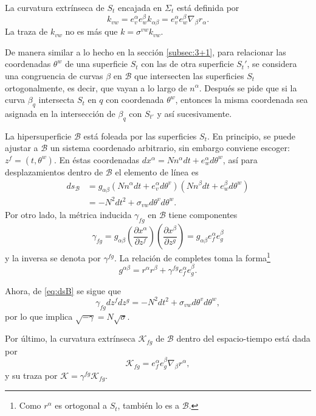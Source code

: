 La curvatura extr\'{i}nseca de $S_{t}$ encajada en $\Sigma_t$ est\'{a} definida por
%
\begin{equation}
\label{eq:extrinseccurvSt}
k_{vw} = e^{\alpha}_{v} e^{\beta}_{w} k_{\alpha \beta} = e^{\alpha}_{v} e^{\beta}_{w} \nabla_{\beta} r_{\alpha}.
\end{equation}
%
La traza de $k_{vw}$ no es m\'{a}s que $k = \sigma^{vw} k_{vw}$.

De manera similar a lo hecho en la secci\'{o}n \ref{subsec:3+1}, para relacionar las coordenadas $\theta^{w}$ de una superficie $S_{t}$ con las de otra superficie $S_{t}'$, se considera una congruencia de curvas $\beta$ en $\mathcal{B}$ que intersecten las superficies $S_{t}$ ortogonalmente, es decir, que vayan a lo largo de $n^{\alpha}$. Despu\'{e}s se pide que si la curva $\beta_{q}$ intersecta $S_{t}$ en $q$ con coordenada $\theta^{w}$, entonces la misma coordenada sea asignada en la intersecci\'{o}n de $\beta_{q}$ con $S_{t'}$ y as\'{i} sucesivamente.

La hipersuperficie $\mathcal{B}$ est\'{a} foleada por las superficies $S_{t}$. En principio, se puede ajustar a $\mathcal{B}$ un sistema coordenado arbitrario, sin embargo conviene escoger: $z^{f} = (t, \theta^{w})$. En \'{e}stas coordenadas $dx^{\alpha} = N n^{\alpha} dt + e^{\alpha}_{w} d \theta^{w}$, as\'{i} para desplazamientos dentro de $\mathcal{B}$ el elemento de l\'{i}nea es
%
\begin{align}
\label{eq:dsB}
ds_{\mathcal{B}} & = g_{\alpha \beta} (N n^{\alpha} dt + e^{\alpha}_{v} d \theta^{v}) (N n^{\beta} dt + e^{\beta}_{w} d \theta^{w}) \nonumber \\
& = - N^{2} dt^{2} + \sigma_{vw} d \theta^{v} d \theta^{w}.
\end{align}
%
Por otro lado, la m\'{e}trica inducida $\gamma_{fg}$ en $\mathcal{B}$ tiene componentes
%
\begin{equation}
\label{eq:indmetricB}
\gamma_{fg} = g_{\alpha \beta} \left( \frac{\partial x^{\alpha}}{\partial z^{f}} \right) \left( \frac{\partial x^{\beta}}{\partial z^{g}} \right) = g_{\alpha \beta} e^{\alpha}_{f} e^{\beta}_{g}
\end{equation}
%
y la inversa se denota por $\gamma^{fg}$. La relaci\'{o}n de completes toma la forma\footnote{Como $r^{\alpha}$ es ortogonal a $S_{t}$, tambi\'{e}n lo es a $\mathcal{B}$.}
%
\begin{equation}
\label{eq:Bcompltrelation}
g^{\alpha \beta} = r^{\alpha} r^{\beta} + \gamma^{fg} e^{\alpha}_{f} e^{\beta}_{g}.
\end{equation}

Ahora, de \eqref{eq:dsB} se sigue que
%
\begin{equation}
\gamma_{fg} dz^{f} dz^{g} =  - N^{2} dt^{2} + \sigma_{vw} d \theta^{v} d \theta^{w},
\end{equation}
%
por lo que implica $\sqrt{-\gamma} = N \sqrt{\sigma}$.

Por \'{u}ltimo,  la curvatura extr\'{i}nseca $\mathcal{K}_{fg}$ de $\mathcal{B}$ dentro del espacio-tiempo est\'{a} dada por
%
\begin{equation}
\mathcal{K}_{fg} = e^{\alpha}_{f} e^{\beta}_{g} \nabla_\beta r^{\alpha},
\end{equation}
%
y su traza por $\mathcal{K} = \gamma^{fg} \mathcal{K}_{fg}$.